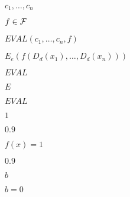 \documentclass[10pt]{book}
\begin{document}
\begin{mdSnippets}
\begin{mdInlineSnippet}[199684e85e8e827ffd866a3382b7d1eb]%
$c_1,\ldots,c_n$\end{mdInlineSnippet}%
\begin{mdInlineSnippet}%
$f\in\mathcal{F}$\end{mdInlineSnippet}%
\begin{mdInlineSnippet}[8832a27f8cb7a2f1dd84dffcb2f3718a]%
$EVAL(c_1,\ldots,c_n,f)$\end{mdInlineSnippet}%
\begin{mdInlineSnippet}[1b2870f6c62f099cc7513810c58b654d]%
$E_e(f(D_d(x_1),\ldots,D_d(x_n)))$\end{mdInlineSnippet}%
\begin{mdInlineSnippet}[1f8cb46fe06733d6f0dd650117e6ab66]%
$EVAL$\end{mdInlineSnippet}%
\begin{mdInlineSnippet}%
$E$\end{mdInlineSnippet}%
\begin{mdInlineSnippet}[1f8cb46fe06733d6f0dd650117e6ab66]%
$EVAL$\end{mdInlineSnippet}%
\begin{mdInlineSnippet}[c4ca4238a0b923820dcc509a6f75849b]%
$1$\end{mdInlineSnippet}%
\begin{mdInlineSnippet}%
$0.9$\end{mdInlineSnippet}%
\begin{mdInlineSnippet}[6cb39328354397c8a463a9005c1b7032]%
$f(x) = 1$\end{mdInlineSnippet}%
\begin{mdInlineSnippet}%
$0.9$\end{mdInlineSnippet}%
\begin{mdInlineSnippet}%
$b$\end{mdInlineSnippet}%
\begin{mdInlineSnippet}[2cd846c62474f70be3291ce24c1bcf6a]%
$b = 0$\end{mdInlineSnippet}%

\end{mdSnippets}
\end{document}
